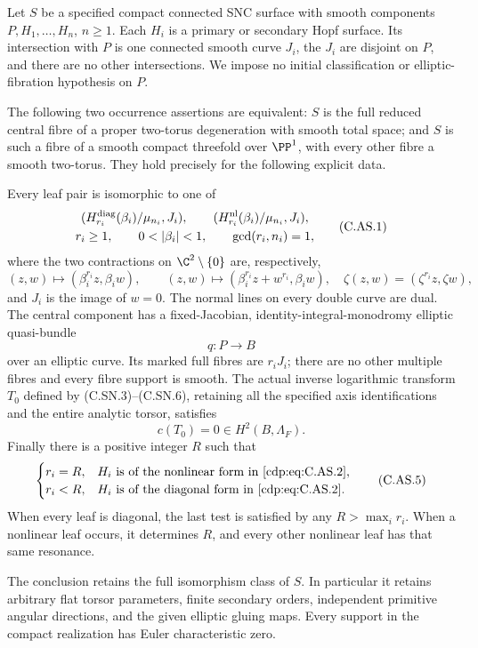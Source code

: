 
\begin{proposition}\label{cdp:st:C.2.UN.53}
Let $S$ be a specified compact connected SNC surface with smooth
components $P,H_1,\ldots,H_n$, $n\ge1$. Each $H_i$ is a primary
or secondary Hopf surface. Its intersection with $P$ is one
connected smooth curve $J_i$, the $J_i$ are disjoint on $P$,
and there are no other intersections. We impose no initial
classification or elliptic-fibration hypothesis on $P$.

The following two occurrence assertions are equivalent: $S$
is the full reduced central fibre of a proper two-torus
degeneration with smooth total space; and $S$ is such a fibre
of a smooth compact threefold over $\PP^1$, with every other
fibre a smooth two-torus. They hold precisely for the following
explicit data.

Every leaf pair is isomorphic to one of
\[
 \begin{gathered}
 (H^{\rm diag}_{r_i}(\beta_i)/\mu_{n_i},J_i),\qquad
 (H^{\rm nl}_{r_i}(\beta_i)/\mu_{n_i},J_i),\\
 r_i\ge1,\qquad 0<|\beta_i|<1,\qquad \gcd(r_i,n_i)=1 ,
 \end{gathered}                                             \tag{C.AS.1}\label{cdp:eq:C.AS.1}
\]
where the two contractions on $\C^2\setminus\{0\}$ are,
respectively,
\[
 (z,w)\longmapsto(\beta_i^{r_i}z,\beta_iw),\qquad
 (z,w)\longmapsto(\beta_i^{r_i}z+w^{r_i},\beta_iw),
 \quad
 \zeta(z,w)=(\zeta^{r_i}z,\zeta w),                         \tag{C.AS.2}\label{cdp:eq:C.AS.2}
\]
and $J_i$ is the image of $w=0$. The normal lines on every
double curve are dual. The central component has a
fixed-Jacobian, identity-integral-monodromy elliptic
quasi-bundle
\[
                         q:P\longrightarrow B             \tag{C.AS.3}\label{cdp:eq:C.AS.3}
\]
over an elliptic curve. Its marked full fibres are $r_iJ_i$;
there are no other multiple fibres and every fibre support
is smooth. The actual inverse logarithmic transform $T_0$
defined by (C.SN.3)--(C.SN.6), retaining all the specified
axis identifications and the entire analytic torsor,
satisfies
\[
                         c(T_0)=0\in H^2(B,\Lambda_F).     \tag{C.AS.4}\label{cdp:eq:C.AS.4}
\]
Finally there is a positive integer $R$ such that
\[
 \begin{cases}
 r_i=R,&H_i\text{ is of the nonlinear form in \eqref{cdp:eq:C.AS.2}},\\
 r_i<R,&H_i\text{ is of the diagonal form in \eqref{cdp:eq:C.AS.2}}.
 \end{cases}                                             \tag{C.AS.5}\label{cdp:eq:C.AS.5}
\]
When every leaf is diagonal, the last test is satisfied by
any $R>\max_i r_i$. When a nonlinear leaf occurs, it
determines $R$, and every other nonlinear leaf has that
same resonance.

The conclusion retains the full isomorphism class of $S$.
In particular it retains arbitrary flat torsor parameters,
finite secondary orders, independent primitive angular
directions, and the given elliptic gluing maps. Every support
in the compact realization has Euler characteristic zero.
\end{proposition}

